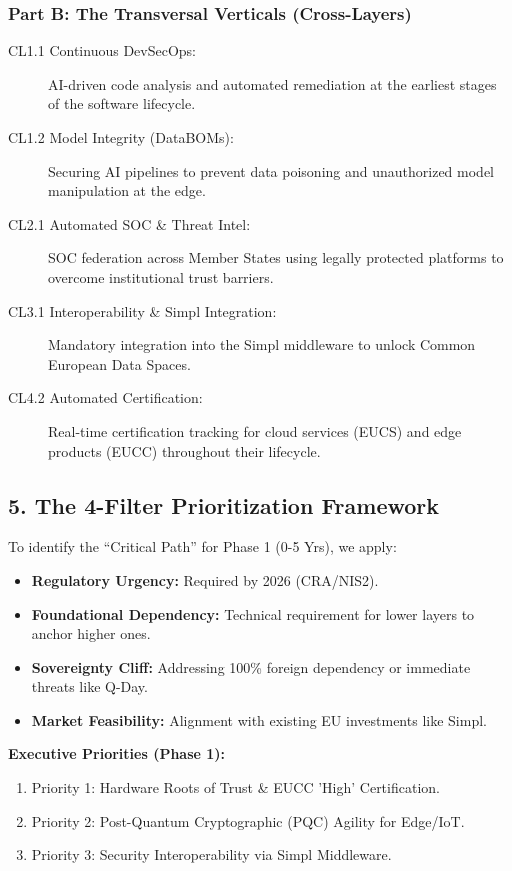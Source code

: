 \documentclass{ieeeaccess}
\begin{document}
\subsubsection{Part B: The Transversal Verticals (Cross-Layers)}
\begin{description}
    \item[CL1.1 Continuous DevSecOps:] AI-driven code analysis and automated remediation at the earliest stages of the software lifecycle.
    \item[CL1.2 Model Integrity (DataBOMs):] Securing AI pipelines to prevent data poisoning and unauthorized model manipulation at the edge.
    \item[CL2.1 Automated SOC \& Threat Intel:] SOC federation across Member States using legally protected platforms to overcome institutional trust barriers.
    \item[CL3.1 Interoperability \& Simpl Integration:] Mandatory integration into the Simpl middleware to unlock Common European Data Spaces.
    \item[CL4.2 Automated Certification:] Real-time certification tracking for cloud services (EUCS) and edge products (EUCC) throughout their lifecycle.
\end{description}

\subsection{5. The 4-Filter Prioritization Framework}
To identify the ``Critical Path''  for Phase 1 (0-5 Yrs), we apply:
\begin{itemize}
    \item \textbf{Regulatory Urgency:} Required by 2026 (CRA/NIS2).
    \item \textbf{Foundational Dependency:} Technical requirement for lower layers to anchor higher ones.
    \item \textbf{Sovereignty Cliff:} Addressing 100\% foreign dependency or immediate threats like Q-Day.
    \item \textbf{Market Feasibility:} Alignment with existing EU investments like Simpl.
\end{itemize}

\noindent \textbf{Executive Priorities (Phase 1):}
\begin{enumerate}
    \item Priority 1: Hardware Roots of Trust \& EUCC 'High' Certification.
    \item Priority 2: Post-Quantum Cryptographic (PQC) Agility for Edge/IoT.
    \item Priority 3: Security Interoperability via Simpl Middleware.
\end{enumerate}
\end{document}

